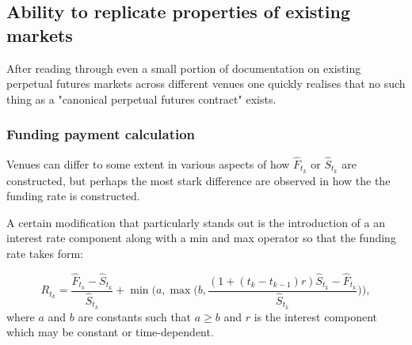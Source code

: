 \documentclass[10pt]{article}
\begin{document}
\subsection{Ability to replicate properties of existing markets}

After reading through even a small portion of documentation on existing perpetual futures markets across different venues one quickly realises that no such thing as a "canonical perpetual futures contract" exists. 

\subsubsection{Funding payment calculation}
Venues can differ to some extent in various aspects of how $\hat F_{t_k}$ or $\hat S_{t_k}$ are constructed, but perhaps the most stark difference are observed in how the the funding rate is constructed.

A certain modification that particularly stands out is the introduction of a an interest rate component along with a min and max operator so that the funding rate takes form:

$$
R_{t_k} = \frac{\hat F_{t_k} - \hat S_{t_k}}{\hat S_{t_k}} + \min \Bigg (a,\max \bigg(b, \frac{(1+(t_k-t_{k-1})r)\hat S_{t_k} - \hat F_{t_k} }{\hat S_{t_k}} \bigg ) \Bigg ), 
$$
where $a$ and $b$ are constants such that $ a \ge b $ and $r$ is the interest component which may be constant or time-dependent.
\end{document}

